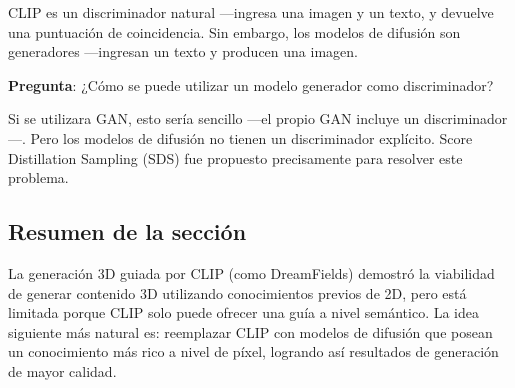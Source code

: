 CLIP es un discriminador natural —ingresa una imagen y un texto, y devuelve una puntuación de coincidencia. Sin embargo, los modelos de difusión son generadores —ingresan un texto y producen una imagen.

\textbf{Pregunta}: ¿Cómo se puede utilizar un modelo generador como discriminador?

Si se utilizara GAN, esto sería sencillo —el propio GAN incluye un discriminador—. Pero los modelos de difusión no tienen un discriminador explícito. Score Distillation Sampling (SDS) fue propuesto precisamente para resolver este problema.

\subsection{Resumen de la sección}

La generación 3D guiada por CLIP (como DreamFields) demostró la viabilidad de generar contenido 3D utilizando conocimientos previos de 2D, pero está limitada porque CLIP solo puede ofrecer una guía a nivel semántico. La idea siguiente más natural es: reemplazar CLIP con modelos de difusión que posean un conocimiento más rico a nivel de píxel, logrando así resultados de generación de mayor calidad.

\newpage
